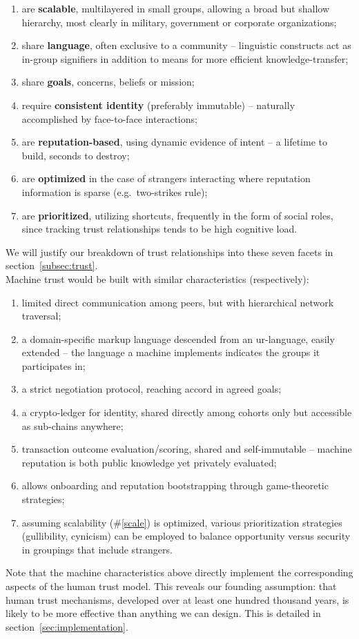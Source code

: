 \begin{enumerate}
	\item are \textbf{scalable}, multilayered in small groups, allowing a broad but shallow hierarchy, most clearly in military, government or corporate organizations; \label{scale}
	\item share \textbf{language}, often exclusive to a community -- linguistic constructs act as in-group signifiers in addition to means for more efficient knowledge-transfer; \label{language}
	\item share \textbf{goals}, concerns, beliefs or mission; \label{mission}
	\item require \textbf{consistent identity} (preferably immutable) -- naturally accomplished by face-to-face interactions; \label{identity}
	\item are \textbf{reputation-based}, using dynamic evidence of intent -- a lifetime to build, seconds to destroy; \label{reputation}
	\item are \textbf{optimized} in the case of strangers interacting where reputation information is sparse (e.g.\ two-strikes rule); \label{optimized}
	\item are \textbf{prioritized}, utilizing shortcuts, frequently in the form of social roles, since tracking trust relationships tends to be high cognitive load. \label{priorities}
\end{enumerate}
We will justify our breakdown of trust relationships into these seven facets in section~\ref{subsec:trust}.
\\[10pt]
Machine trust would be built with similar characteristics (respectively):
\begin{enumerate}
	\item limited direct communication among peers, but with hierarchical network traversal;
	\item a domain-specific markup language descended from an ur-language, easily extended -- the language a machine implements indicates the groups it participates in;
	\item a strict negotiation protocol, reaching accord in agreed goals;
	\item a crypto-ledger for identity, shared directly among cohorts only but accessible as sub-chains anywhere;
	\item transaction outcome evaluation/scoring, shared and self-immutable -- machine reputation is both public knowledge yet privately evaluated;
	\item allows onboarding and reputation bootstrapping through game-theoretic strategies;
	\item assuming scalability (\#\ref{scale}) is optimized, various prioritization strategies (gullibility, cynicism) can be employed to balance opportunity versus security in groupings that include strangers.
\end{enumerate}
Note that the machine characteristics above directly implement the corresponding aspects of the human trust model.
This reveals our founding assumption: that human trust mechanisms, developed over at least one hundred thousand years, is likely to be more effective than anything we can design.
This is detailed in section~\ref{sec:implementation}.


